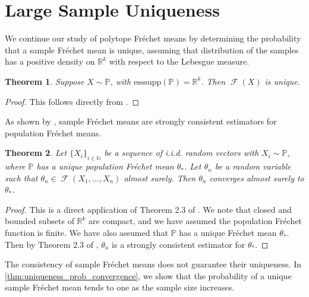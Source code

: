 \documentclass[10pt]{article}
\newtheorem{theorem}{Theorem}[section]
\theoremstyle{definition}
\theoremstyle{remark}
\newcommand{\R}{\mathbb{R}}
\newcommand{\N}{\mathbb{N}}
\newcommand{\esssupp}{\mathrm{esssupp}}
\DeclareMathOperator{\FMset}{\mathcal{F}}
\newcommand{\mb}[1]{\mathbb #1}
\begin{document}
	\section{Large Sample Uniqueness} \label{sec:large_sample_uniqueness}
	
	We continue our study of polytope Fr\'echet means by determining the probability that a sample Fr\'echet mean is unique, assuming that distribution of the samples has a positive density on $\R^k$ with respect to the Lebesgue measure.
	
	\begin{theorem}\label{thm:unique_population_FM}
		Suppose $X \sim \mb P$, with $\esssupp (\mb P) = \R^k$. Then $\FMset (X)$ is unique.
	\end{theorem}
	
	\begin{proof}
		This follows directly from . 
	\end{proof}
	
	As shown by \cite{BhatPatFMI}, sample Fr\'echet means are strongly consistent estimators for population Fr\'echet means.
	
	\begin{theorem}\label{thm:consistent_FM}
		Let $\{X_i\}_{i \in \N}$ be a sequence of i.i.d. random vectors with $X_i \sim \mb{P}$, where $\mb P$ has a unique population Fr\'echet mean $\theta_*$. Let  $\theta_n$ be a random variable such that $\theta_n \in \FMset(X_1, \dots, X_n)$ almost surely. Then $\theta_n$ converges almost surely to $\theta_*$.
	\end{theorem}
	
	\begin{proof}
		This is a direct application of Theorem 2.3 of \citep{BhatPatFMI}. We note that closed and bounded subsets of $\R^k$ are compact, and we have assumed the population Fr\'echet function is finite. We have also assumed that $\mb P$ has a unique Fr\'echet mean $\theta_*$. Then by Theorem 2.3 of \cite{BhatPatFMI}, $\theta_n$ is a strongly consistent estimator for $\theta_*$.
	\end{proof}
	
	The consistency of sample Fr\'echet means does not guarantee their uniqueness. In \cref{thm:uniqueness_prob_convergence}, we show that the probability of a unique sample Fr\'echet mean tends to one as the sample size increases.
	
\end{document}
